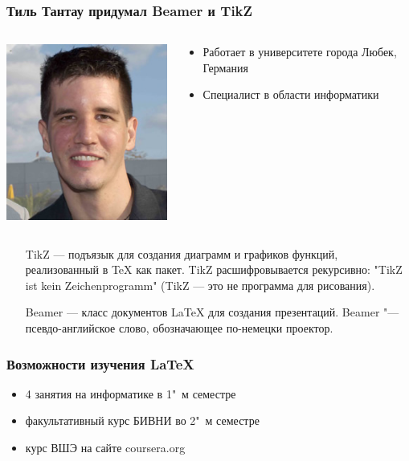 \documentclass[10pt,pdf,hyperref={unicode}]{beamer}
\begin{document}
\begin{frame}
    \frametitle{Тиль Тантау придумал Beamer и TikZ}
    \begin{columns}[c]
        \begin{column}{0.5\textwidth}
            \includegraphics[keepaspectratio,height=0.5\textheight]{till_tantau.jpg}
        \end{column}
        \begin{column}{0.5\textwidth}
            \begin{itemize}
                \item Работает в университете города Любек, Германия
                \item Специалист в области информатики  
            \end{itemize}
        \end{column}
    \end{columns}
    \vfill
    \begin{itemize}
        \item[TikZ] --- подъязык для создания диаграмм и графиков функций, реализованный в \TeX{} как пакет. TikZ расшифровывается рекурсивно: "TikZ ist kein Zeichenprogramm"  (TikZ --- это не программа для рисования).
        \item[Beamer] --- класс документов \LaTeX{} для создания презентаций. Beamer "--- псевдо-английское слово, обозначающее по-немецки проектор. 
    \end{itemize}    
\end{frame}

\begin{frame}
    \frametitle{Возможности изучения \LaTeX}
    
    \begin{itemize}
        \item 4 занятия на информатике в 1"~м семестре 
        \item факультативный курс БИВНИ во 2"~м семестре
        \item курс ВШЭ на сайте coursera.org
        \end{itemize}
\end{frame}
\end{document}
